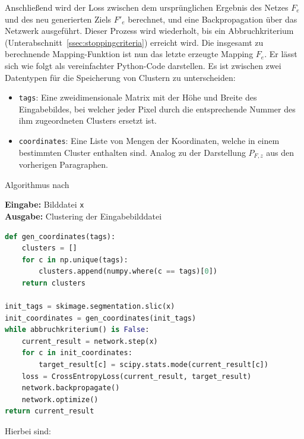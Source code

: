 
Anschließend wird der Loss zwischen dem ursprünglichen Ergebnis des Netzes $F_e$ und des neu generierten Ziels $F'_e$ berechnet, und eine Backpropagation über das Netzwerk ausgeführt. Dieser Prozess wird wiederholt, bis ein Abbruchkriterium (\vgl Unterabschnitt~\ref{ssec:stoppingcriteria}) erreicht wird. Die insgesamt zu berechnende Mapping-Funktion ist nun das letzte erzeugte Mapping $F_e$. Er lässt sich wie folgt als vereinfachter Python-Code darstellen. Es ist zwischen zwei Datentypen für die Speicherung von Clustern zu unterscheiden:

\begin{itemize}
	\item{\lstinline[columns=fixed]{tags}:} Eine zweidimensionale Matrix mit der Höhe und Breite des Eingabebildes, bei welcher jeder Pixel durch die entsprechende Nummer des ihm zugeordneten Clusters ersetzt ist.
	\item{\lstinline[columns=fixed]{coordinates}:} Eine Liste von Mengen der Koordinaten, welche in einem bestimmten Cluster enthalten sind. Analog zu der Darstellung $P_{F,z}$ aus den vorherigen Paragraphen.
\end{itemize}

\begin{algorithm}[H]
\caption{Algorithmus nach \cite{kanezaki_18}}
\textbf{Eingabe:} Bilddatei \lstinline[columns=fixed]{x}\\
\textbf{Ausgabe:} Clustering der Eingabebilddatei 
\begin{lstlisting}[language=Python]
def gen_coordinates(tags):
	clusters = []
	for c in np.unique(tags):
		clusters.append(numpy.where(c == tags)[0])
	return clusters

init_tags = skimage.segmentation.slic(x)
init_coordinates = gen_coordinates(init_tags)
while abbruchkriterium() is False:
	current_result = network.step(x)
	for c in init_coordinates:
		target_result[c] = scipy.stats.mode(current_result[c])
	loss = CrossEntropyLoss(current_result, target_result)
	network.backpropagate()
	network.optimize()
return current_result
\end{lstlisting}
\end{algorithm}

Hierbei sind:

